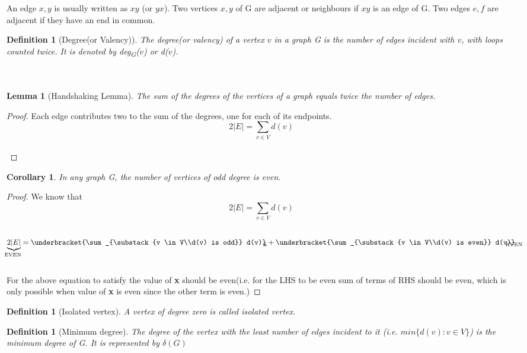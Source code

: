 \documentclass{article}
\newtheorem{lemma}[theorem]{Lemma}
\newtheorem{corollary}[theorem]{Corollary}
\newtheorem{definition}[theorem]{Definition}
\begin{document}
\quad An edge ${x,y}$ is usually written as $xy$ (or $yx$). 
Two vertices ${x,y}$ of G are adjacent or neighbours if $xy$ is an edge of G. 
Two edges $e,f$ are adjacent if they have an end in common.

\begin{definition}[Degree(or Valency)]
\quad The \emph{degree(or valency)} of a vertex $v$ in a graph G is the number of edges incident with $v$, 
with loops counted twice. It is denoted by deg\textsubscript{G}($v$) or d($v$).\\~\\~\\
\end{definition}

\begin{lemma}[Handshaking Lemma]
The sum of the degrees of the vertices of a graph equals twice the number of edges.
\end{lemma}

\begin{proof}
Each edge contributes two to the sum of the degrees, one for each of its endpoints.
$$ 2|E| = \sum_{v \in V} d(v)$$\\
\end{proof}

\begin{corollary}
In any graph G, the number of vertices of odd degree is even.
\end{corollary}

\begin{proof}
We know that
$$ 2|E| = \sum_{v \in V} d(v)$$\\
$$ \underbrace{2|E|}_\text{\clap{EVEN~}} = 
\underbracket{\sum_{\substack{v \in V\\d(v) is odd}} d(v)}_\text{\clap{\textbf{x~}}} 
+ \underbracket{\sum_{\substack{v \in V\\d(v) is even}} d(v)}_\text{\clap{EVEN~}} $$\\
\quad For the above equation to satisfy the value of \textbf{x} should be even(i.e. for the LHS 
to be even sum of terms of RHS should be even, which is only possible when value of \textbf{x}
is even since the other term is even.)
\end{proof}

\begin{definition}[Isolated vertex]
\quad A vertex of degree zero is called isolated vertex.\\
\end{definition}

\begin{definition}[Minimum degree]
\quad The degree of the vertex with the least number of edges incident to it 
(i.e. $min\{d(v) : v \in V\}$) is the minimum degree of G.
It is represented by $\delta(G)$\\
\end{definition}
\end{document}
